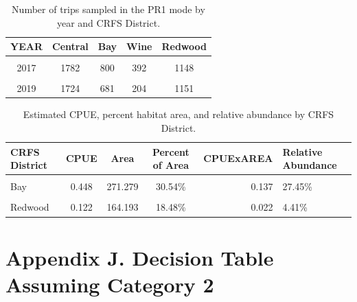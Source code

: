 \documentclass[11pt,
  english,
]{article}
\begin{document}
\begin{table}

\caption{\label{tab:number-trips}Number of trips sampled in the PR1 mode by year and CRFS District.}
\centering
\begin{tabular}[t]{ccccc}
\toprule
YEAR & Central & Bay & Wine & Redwood\\
\midrule
\cellcolor{gray!6}{2016} & \cellcolor{gray!6}{2175} & \cellcolor{gray!6}{795} & \cellcolor{gray!6}{279} & \cellcolor{gray!6}{1108}\\
2017 & 1782 & 800 & 392 & 1148\\
\cellcolor{gray!6}{2018} & \cellcolor{gray!6}{1783} & \cellcolor{gray!6}{677} & \cellcolor{gray!6}{345} & \cellcolor{gray!6}{1149}\\
2019 & 1724 & 681 & 204 & 1151\\
\bottomrule
\end{tabular}
\end{table}

\begin{table}

\caption{\label{tab:rel-cpue}Estimated CPUE, percent habitat area, and relative abundance by CRFS District.}
\centering
\begin{tabular}[t]{lcccrl}
\toprule
CRFS District & CPUE & Area & Percent of Area & CPUExAREA & Relative Abundance\\
\midrule
\cellcolor{gray!6}{Central} & \cellcolor{gray!6}{0.833} & \cellcolor{gray!6}{315.912} & \cellcolor{gray!6}{35.56\%} & \cellcolor{gray!6}{0.296} & \cellcolor{gray!6}{59.32\%}\\
Bay & 0.448 & 271.279 & 30.54\% & 0.137 & 27.45\%\\
\cellcolor{gray!6}{Wine} & \cellcolor{gray!6}{0.286} & \cellcolor{gray!6}{136.937} & \cellcolor{gray!6}{15.42\%} & \cellcolor{gray!6}{0.044} & \cellcolor{gray!6}{8.82\%}\\
Redwood & 0.122 & 164.193 & 18.48\% & 0.022 & 4.41\%\\
\bottomrule
\end{tabular}
\end{table}

\newpage


\hypertarget{appendix-j.-decision-table-assuming-category-2}{%
\section*{Appendix J. Decision Table Assuming Category 2}\label{appendix-j.-decision-table-assuming-category-2}}
\end{document}
